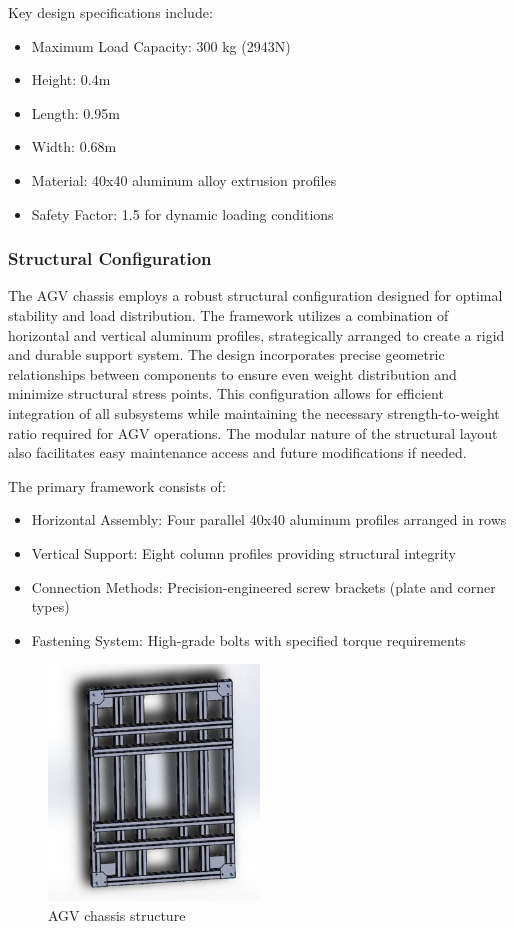 \documentclass[../../main]{subfiles}
\begin{document}
Key design specifications include:

\begin{itemize}
\item
  Maximum Load Capacity: 300 kg (2943N)
\item
  Height: 0.4m
\item
  Length: 0.95m
\item
  Width: 0.68m
\item
  Material: 40x40 aluminum alloy extrusion profiles
\item
  Safety Factor: 1.5 for dynamic loading conditions
\end{itemize}

\subsubsection{Structural Configuration}\label{structural-configuration}

The AGV chassis employs a robust structural configuration designed for
optimal stability and load distribution. The framework utilizes a
combination of horizontal and vertical aluminum profiles, strategically
arranged to create a rigid and durable support system. The design
incorporates precise geometric relationships between components to
ensure even weight distribution and minimize structural stress points.
This configuration allows for efficient integration of all subsystems
while maintaining the necessary strength-to-weight ratio required for
AGV operations. The modular nature of the structural layout also
facilitates easy maintenance access and future modifications if needed.

The primary framework consists of:

\begin{itemize}
\item
  Horizontal Assembly: Four parallel 40x40 aluminum profiles arranged in
  rows
\item
  Vertical Support: Eight column profiles providing structural integrity
\item
  Connection Methods: Precision-engineered screw brackets (plate and
  corner types)
\item
  Fastening System: High-grade bolts with specified torque requirements
\end{itemize}

\begin{figure}[h!]
  \centering
  \includegraphics[width=0.5\textwidth]{img/image110.jpg}
  \caption{AGV chassis structure}
  \end{figure}
  
\end{document}
